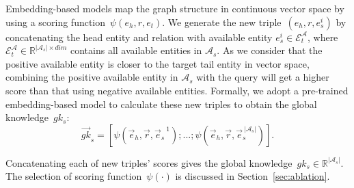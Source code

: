 
Embedding-based models map the graph structure in continuous vector space by using a scoring function~$\psi(e_{h},r,e_{t})$.
We generate the new triple~$(e_{h},r,e_{s}^i)$ by concatenating the head entity and relation with available entity $e_{s}^i \in {\mathcal{E}}_{t}^{\mathcal{A}}$, where ${\mathcal{E}}_{t}^{\mathcal{A}}\in \mathbb{R}^{\left | \mathcal{A}_{s} \right |\times dim}$ contains all available entities in $\mathcal{A}_{s}$.
As we consider that the positive available entity is closer to the target tail entity in vector space, combining the positive available entity in $\mathcal{A}_{s}$ with the query will get a higher score than that using negative available entities.
Formally, we adopt a pre-trained embedding-based model
to calculate these new triples to obtain the global knowledge~$gk_{s}$:
\begin{equation}
        \vec{gk}_{s} =[\psi({\vec{e}_{h}},\vec{r},{\vec{e}_{s}}^{~1});...;\psi({\vec{e}_{h}},\vec{r},\vec{e}_{s}^{~\left | \mathcal{A}_{s} \right |})].
\label{eq:gef}
\end{equation}

Concatenating each of new triples' scores gives the global knowledge~$gk_{s} \in \mathbb{R}^{\left | \mathcal{A}_{s} \right |}$. The selection of scoring function~$\psi(\cdot)$ is discussed in Section~\ref{sec:ablation}.








